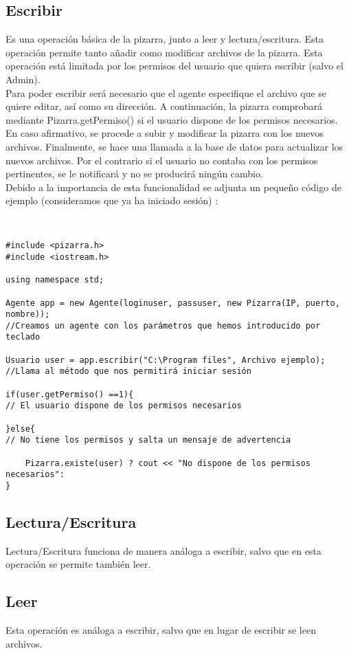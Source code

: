 \subsection{Escribir}
Es una operación básica de la pizarra, junto a leer y lectura/escritura. Esta operación permite tanto añadir como modificar archivos de la pizarra. Esta operación está limitada por los permisos del usuario que quiera escribir (salvo el Admin).\\
Para poder escribir será necesario que el agente especifique el archivo que se quiere editar, así como su dirección. A continuación, la pizarra comprobará mediante Pizarra.getPermiso() si el usuario dispone de los permisos necesarios. En caso afirmativo, se procede a subir y modificar la pizarra con los nuevos archivos. Finalmente, se hace una llamada a la base de datos para actualizar los nuevos archivos. Por el contrario si el usuario no contaba con los permisos pertinentes, se le notificará y no se producirá ningún cambio.\\
Debido a la importancia de esta funcionalidad se adjunta un pequeño código de ejemplo (consideramos que ya ha iniciado sesión) :
\begin{verbatim}


#include <pizarra.h>
#include <iostream.h>

using namespace std;

Agente app = new Agente(loginuser, passuser, new Pizarra(IP, puerto, nombre)); 
//Creamos un agente con los parámetros que hemos introducido por teclado

Usuario user = app.escribir("C:\Program files", Archivo ejemplo); 
//Llama al método que nos permitirá iniciar sesión

if(user.getPermiso() ==1){ 
// El usuario dispone de los permisos necesarios

}else{            
// No tiene los permisos y salta un mensaje de advertencia

    Pizarra.existe(user) ? cout << "No dispone de los permisos necesarios":
}
\end{verbatim}
\subsection{Lectura/Escritura}
Lectura/Escritura funciona de manera análoga a escribir, salvo que en esta operación se permite también leer.
\subsection{Leer}
Esta operación es análoga a escribir, salvo que en lugar de escribir se leen archivos.

